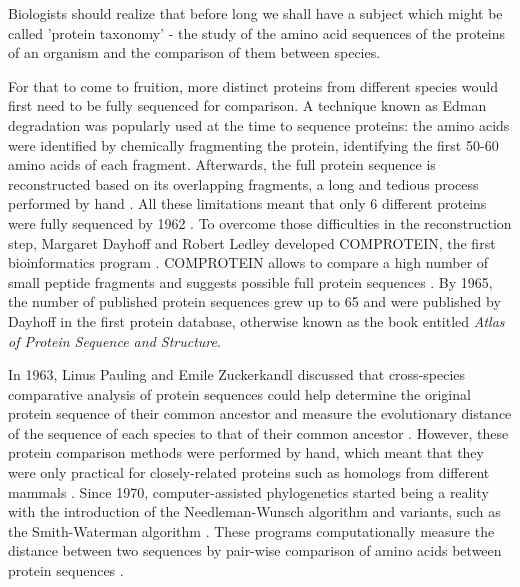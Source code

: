 \begin{displayquote}
Biologists should realize that before long we shall have a subject which might be called 'protein taxonomy' - the study of the amino acid sequences of the proteins of an organism and the comparison of them between species.
\end{displayquote}

For that to come to fruition, more distinct proteins from different species would first need to be fully sequenced for comparison. A technique known as Edman degradation was popularly used at the time to sequence proteins: the amino acids were identified by chemically fragmenting the protein, identifying the first 50-60 amino acids of each fragment. Afterwards, the full protein sequence is reconstructed based on its overlapping fragments, a long and tedious process performed by hand \cite{gauthier:2018ws,edman:1949ww}. All these limitations meant that only 6 different proteins were fully sequenced by 1962 \cite{dayhoff:1962up}. To overcome those difficulties in the reconstruction step, Margaret Dayhoff and Robert Ledley developed COMPROTEIN, the first bioinformatics program \cite{gauthier:2018ws,dayhoff:1962up}. COMPROTEIN allows to compare a high number of small peptide fragments and suggests possible full protein sequences \cite{dayhoff:1962up}. By 1965, the number of published protein sequences grew up to 65 and were published by Dayhoff in the first protein database, otherwise known as the book entitled \emph{Atlas of Protein Sequence and Structure}\cite{dayhoff:1965vv}.

In 1963, Linus Pauling and Emile Zuckerkandl discussed that cross-species comparative analysis of protein sequences could help determine the original protein sequence of their common ancestor and measure the evolutionary distance of the sequence of each species to that of their common ancestor \cite{pauling:1963uo}. However, these protein comparison methods were performed by hand, which meant that they were only practical for closely-related proteins such as homologs from different mammals \cite{gauthier:2018ws}. Since 1970, computer-assisted phylogenetics started being a reality with the introduction of the Needleman-Wunsch algorithm \cite{needleman:1970vq} and variants, such as the Smith-Waterman algorithm \cite{smith:1981up}. These programs computationally measure the distance between two sequences by pair-wise comparison of amino acids between protein sequences \cite{needleman:1970vq,smith:1981up}.


